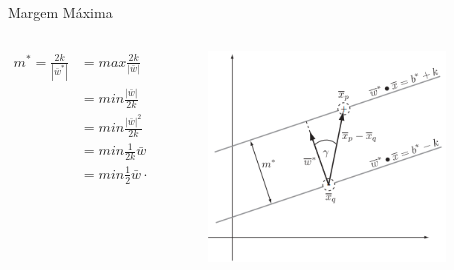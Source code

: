 \documentclass{beamer}
\begin{document}
\begin{frame}{Margem Máxima}
\begin{columns}
    \begin{column}{.49\textwidth}
        \begin{equation}
        \begin{split}
        m^*=\frac{2k}{|\bar{w}^*|} &= max \frac{2k}{|\bar{w}|} \\
            &= min \frac{|\bar{w}|}{2k} \\
            &= min \frac{|\bar{w}|^2}{2k}  \\
            &= min \frac{1}{2k} \bar{w}\cdot\bar{w}  \\
            &= min \frac{1}{2} \bar{w}\cdot\bar{w}
        \end{split}
        \end{equation}
    \end{column}
    \begin{column}{.49\textwidth}
    \begin{figure}
      \centering
      \includegraphics[width=0.9\textwidth]{svm_4.png}
    \end{figure}
    \end{column}
\end{columns}
\end{frame}
\end{document}
